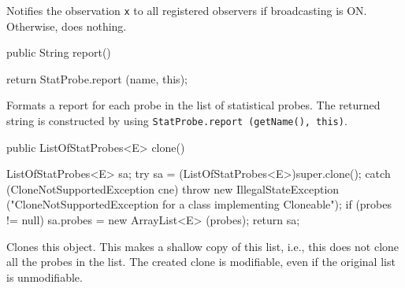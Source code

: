 \begin{tabb}   Notifies the observation \texttt{x} to all registered observers
   if broadcasting is ON.  Otherwise, does nothing.
\end{tabb}
\begin{code}

   public String report()\begin{hide} {
      return StatProbe.report (name, this);
   }\end{hide}
\end{code}
\begin{tabb}   Formats a report for each probe in the list of
 statistical probes.  The returned string is constructed by
 using \texttt{StatProbe.report (getName(), this)}.
\end{tabb}
\begin{htmlonly}
\end{htmlonly}
\begin{code}

   public ListOfStatProbes<E> clone()\begin{hide} {
      ListOfStatProbes<E> sa;
      try {
         sa = (ListOfStatProbes<E>)super.clone();
      }
      catch (CloneNotSupportedException cne) {
         throw new IllegalStateException ("CloneNotSupportedException for a class implementing Cloneable");
      }
      if (probes != null)
         sa.probes = new ArrayList<E> (probes);
      return sa;
   }\end{hide}
\end{code}
\begin{tabb}   Clones this object.   This makes a shallow copy
  of this list, i.e., this does not clone all the probes in the list.
  The created clone is modifiable, even if the original list is unmodifiable.
\end{tabb}
